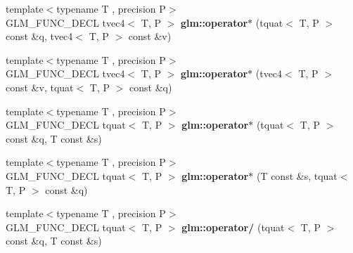 \begin{DoxyCompactItemize}
\item 
\hypertarget{group__gtc__quaternion_gaeee3d385665cb25b6d728524b8d8fa66}{{\footnotesize template$<$typename T , precision P$>$ }\\G\-L\-M\-\_\-\-F\-U\-N\-C\-\_\-\-D\-E\-C\-L tvec4$<$ T, P $>$ {\bfseries glm\-::operator$\ast$} (tquat$<$ T, P $>$ const \&q, tvec4$<$ T, P $>$ const \&v)}\label{group__gtc__quaternion_gaeee3d385665cb25b6d728524b8d8fa66}

\item 
\hypertarget{group__gtc__quaternion_ga9f4715d30e26cde878f16fef75b8e049}{{\footnotesize template$<$typename T , precision P$>$ }\\G\-L\-M\-\_\-\-F\-U\-N\-C\-\_\-\-D\-E\-C\-L tvec4$<$ T, P $>$ {\bfseries glm\-::operator$\ast$} (tvec4$<$ T, P $>$ const \&v, tquat$<$ T, P $>$ const \&q)}\label{group__gtc__quaternion_ga9f4715d30e26cde878f16fef75b8e049}

\item 
\hypertarget{group__gtc__quaternion_ga64f3ff448c382fd6642eafddd6ff65ea}{{\footnotesize template$<$typename T , precision P$>$ }\\G\-L\-M\-\_\-\-F\-U\-N\-C\-\_\-\-D\-E\-C\-L tquat$<$ T, P $>$ {\bfseries glm\-::operator$\ast$} (tquat$<$ T, P $>$ const \&q, T const \&s)}\label{group__gtc__quaternion_ga64f3ff448c382fd6642eafddd6ff65ea}

\item 
\hypertarget{group__gtc__quaternion_ga8b18b7e92f80b6b26550a1035bca33ba}{{\footnotesize template$<$typename T , precision P$>$ }\\G\-L\-M\-\_\-\-F\-U\-N\-C\-\_\-\-D\-E\-C\-L tquat$<$ T, P $>$ {\bfseries glm\-::operator$\ast$} (T const \&s, tquat$<$ T, P $>$ const \&q)}\label{group__gtc__quaternion_ga8b18b7e92f80b6b26550a1035bca33ba}

\item 
\hypertarget{group__gtc__quaternion_gab52fd3ac627908aa2aa1df96ddcdd113}{{\footnotesize template$<$typename T , precision P$>$ }\\G\-L\-M\-\_\-\-F\-U\-N\-C\-\_\-\-D\-E\-C\-L tquat$<$ T, P $>$ {\bfseries glm\-::operator/} (tquat$<$ T, P $>$ const \&q, T const \&s)}\label{group__gtc__quaternion_gab52fd3ac627908aa2aa1df96ddcdd113}


\end{DoxyCompactItemize}
